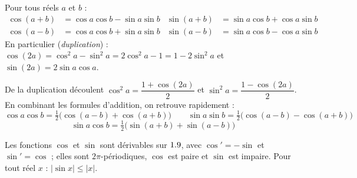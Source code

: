 
\begin{theoreme}
Pour tous réels $a$ et $b$ :
\begin{align*}
  \cos(a+b)&=\cos a\cos b-\sin a\sin b & \sin(a+b)&=\sin a\cos b+\cos a\sin b\\
  \cos(a-b)&=\cos a\cos b+\sin a\sin b & \sin(a-b)&=\sin a\cos b-\cos a\sin b
\end{align*}
En particulier (\emph{duplication}) :
$\cos(2a)=\cos^{2}a-\sin^{2}a=2\cos^{2}a-1=1-2\sin^{2}a$ et
$\sin(2a)=2\sin a\cos a$.
\end{theoreme}

\begin{propriete}
De la duplication découlent
$\cos^{2}a=\dfrac{1+\cos(2a)}{2}$ et $\sin^{2}a=\dfrac{1-\cos(2a)}{2}$.
En combinant les formules d'addition, on retrouve rapidement :
\[
  \cos a\cos b=\tfrac12\bigl(\cos(a-b)+\cos(a+b)\bigr)\qquad
  \sin a\sin b=\tfrac12\bigl(\cos(a-b)-\cos(a+b)\bigr)
\]
\[
  \sin a\cos b=\tfrac12\bigl(\sin(a+b)+\sin(a-b)\bigr)
\]
\end{propriete}

\begin{propriete}
Les fonctions $\cos$ et $\sin$ sont dérivables sur $1.9$, avec
$\cos'=-\sin$ et $\sin'=\cos$ ; elles sont $2\pi$-périodiques, $\cos$ est
paire et $\sin$ est impaire. Pour tout réel $x$ : $|\sin x|\leq|x|$.
\end{propriete}

